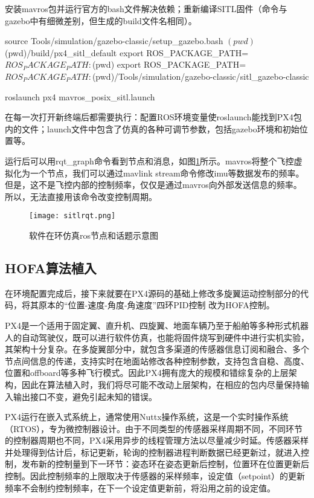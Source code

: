 安装mavros包并运行官方的bash文件解决依赖；重新编译SITL固件（命令与gazebo中有细微差别，但生成的build文件名相同）。
\begin{codeblock}[language=C]
  source Tools/simulation/gazebo-classic/setup_gazebo.bash $(pwd) $(pwd)/build/px4_sitl_default
  export ROS_PACKAGE_PATH=$ROS_PACKAGE_PATH:$(pwd)
  export ROS_PACKAGE_PATH=$ROS_PACKAGE_PATH:$(pwd)/Tools/simulation/gazebo-classic/sitl_gazebo-classic

  roslaunch px4 mavros_posix_sitl.launch
\end{codeblock}


在每一次打开新终端后都需要执行：配置ROS环境变量使roslaunch能找到PX4包内的文件；launch文件中包含了仿真的各种可调节参数，包括gazebo环境和初始位置等。

运行后可以用rqt\_graph命令看到节点和消息，如图\ref{sitlrqt}所示。mavros将整个飞控虚拟化为一个节点，我们可以通过mavlink stream命令修改imu等数据发布的频率。但是，这不是飞控内部的控制频率，仅仅是通过mavros向外部发送信息的频率。所以，无法直接用该命令改变控制周期。
\begin{figure}[!h]
  \centering
  \texttt{[image: sitlrqt.png]}
  \caption{软件在环仿真ros节点和话题示意图}
  \label{sitlrqt}
\end{figure}

 \subsection*{HOFA算法植入}
在环境配置完成后，接下来就要在PX4源码的基础上修改多旋翼运动控制部分的代码，将其原本的“位置-速度-角度-角速度”四环PID控制 \cite{px4控制}改为HOFA控制。

PX4是一个适用于固定翼、直升机、四旋翼、地面车辆乃至于船舶等多种形式机器人的自动驾驶仪，既可以进行软件仿真，也能将固件烧写到硬件中进行实机实验，其架构十分复杂。在多旋翼部分中，就包含多渠道的传感器信息订阅和融合、多个节点间信息的传递，支持实时在地面站修改各种控制参数，支持包含自稳、高度、位置和offboard等多种飞行模式。因此PX4拥有庞大的规模和错综复杂的上层架构，因此在算法植入时，我们将尽可能不改动上层架构，在相应的包内尽量保持输入输出接口不变，避免引起未知的错误。

PX4运行在嵌入式系统上，通常使用Nuttx操作系统，这是一个实时操作系统（RTOS），专为微控制器设计。由于不同类型的传感器采样周期不同，不同环节的控制器周期也不同，PX4采用异步的线程管理方法以尽量减少时延。传感器采样并处理得到估计后，标记更新，轮询的控制器进程判断数据已经更新过，就进入控制，发布新的控制量到下一环节：姿态环在姿态更新后控制，位置环在位置更新后控制。因此控制频率的上限取决于传感器的采样频率，设定值（setpoint）的更新频率不会制约控制频率，在下一个设定值更新前，将沿用之前的设定值。

